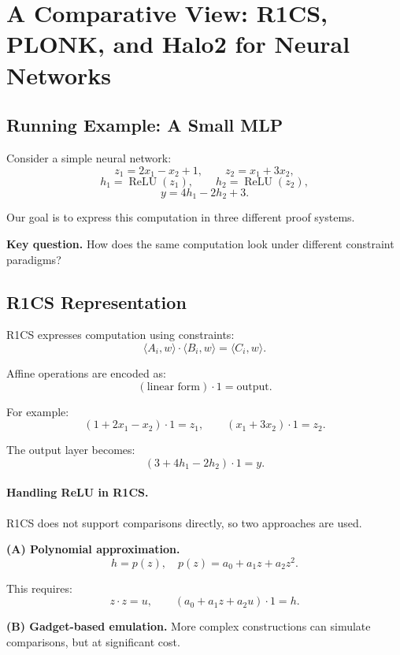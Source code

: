 \section{A Comparative View: R1CS, PLONK, and Halo2 for Neural Networks}

\subsection{Running Example: A Small MLP}

Consider a simple neural network:
\[
z_1 = 2x_1 - x_2 + 1, \qquad
z_2 = x_1 + 3x_2,
\]
\[
h_1 = \operatorname{ReLU}(z_1), \qquad
h_2 = \operatorname{ReLU}(z_2),
\]
\[
y = 4h_1 - 2h_2 + 3.
\]

Our goal is to express this computation in three different proof systems.

\medskip

\noindent
\textbf{Key question.}  
How does the same computation look under different constraint paradigms?

\subsection{R1CS Representation}

R1CS expresses computation using constraints:
\[
\langle A_i, w \rangle \cdot \langle B_i, w \rangle = \langle C_i, w \rangle.
\]

Affine operations are encoded as:
\[
(\text{linear form}) \cdot 1 = \text{output}.
\]

For example:
\[
(1 + 2x_1 - x_2)\cdot 1 = z_1,
\qquad
(x_1 + 3x_2)\cdot 1 = z_2.
\]

The output layer becomes:
\[
(3 + 4h_1 - 2h_2)\cdot 1 = y.
\]

\paragraph{Handling ReLU in R1CS.}

R1CS does not support comparisons directly, so two approaches are used.

\medskip

\noindent
\textbf{(A) Polynomial approximation.}
\[
h = p(z), \quad p(z) = a_0 + a_1 z + a_2 z^2.
\]

This requires:
\[
z \cdot z = u, \qquad
(a_0 + a_1 z + a_2 u)\cdot 1 = h.
\]

\medskip

\noindent
\textbf{(B) Gadget-based emulation.}  
More complex constructions can simulate comparisons, but at significant cost.

